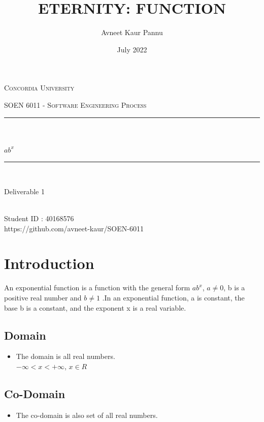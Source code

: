\documentclass[a4paper,12pt]{report}
\title{ETERNITY: FUNCTION}
\author{Avneet Kaur Pannu}
\date{July 2022}
\makeatletter
\let\thetitle\@title
\let\theauthor\@author
\makeatother
\begin{document}
\begin{titlepage}
	\centering
    \vspace*{0.5 cm}
\begin{center}    \textsc{\Large Concordia University}\\[2.0 cm]	\end{center}
	\textsc{\Large  SOEN 6011 - Software Engineering Process }\\[0.5 cm]
	\rule{\linewidth}{0.2 mm} \\[0.4 cm]
	{ \huge \textbf \thetitle}\\[0.2 cm]
	{ \huge \textbf{$ab^{x}$}}
	\rule{\linewidth}{0.2 mm} \\[1.5 cm]

\begin{center}   {\Large Deliverable 1}\\[2.0 cm]
\end{center}

\begin{center}   {\Large \textbf{\theauthor}} \\[0.2 cm]
                 {\large Student ID : 40168576 }\\[0.2 cm]
                 {\large https://github.com/avneet-kaur/SOEN-6011}
\end{center}
\end{titlepage}

\renewcommand{\thesection}{\arabic{section}}
\tableofcontents
\pagebreak



\section{Introduction}
An exponential function is a function with the general form $ab^{x}$, $a\neq 0$, b is a positive real number and $b\neq 1$ .In an exponential function, a is constant, the base b is a constant, and the exponent x is a real variable.\cite{b1}

\subsection{Domain}
\begin{itemize}
\item The domain is all real numbers.
\\$- \infty < x < + \infty$, $x \in R$ \cite{b1}
\end{itemize}

\subsection{Co-Domain}
\begin{itemize}
  \item  The co-domain is also set of all real numbers.
\end{itemize}
\end{document}
